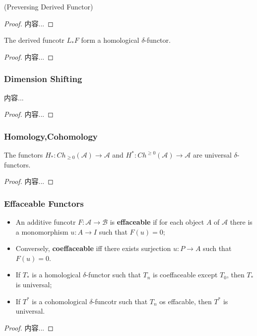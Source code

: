 \documentclass[Total.tex]{subfiles}
\begin{document}
			\begin{proposition}
				(Preversing Derived Functor)
			\end{proposition}
			\begin{proof}
				内容...
			\end{proof}
			
			\begin{theorem}
				The derived funcotr $L_*F$ form a homological $\delta$-functor.
			\end{theorem}
			\begin{proof}
				内容...
			\end{proof}
			\subsubsection{Dimension Shifting}
			\begin{proposition}
				内容...
			\end{proposition}
			\begin{proof}
				内容...
			\end{proof}
			\subsubsection{Homology,Cohomology}
			\begin{proposition}
				The functors $H_*:Ch_{\geq 0}(\mathcal{A})\rightarrow \mathcal{A}$ and $H^*:Ch^{\geq 0}(\mathcal{A})\rightarrow \mathcal{A}$ are universal $\delta$-functors.
			\end{proposition}
			\begin{proof}
				内容...
			\end{proof}
			\subsubsection{Effaceable Functors}
			\begin{Def}
				\begin{itemize}
					\item An additive funcotr $F:\mathcal{A}\rightarrow \mathcal{B}$ is \textbf{effaceable} if for each object $A$ of $\mathcal{A}$ there is a monomorphism $u:A\rightarrow I$ such that $F(u)=0$;
					\item Conversely, \textbf{coeffaceable} iff there exists surjection $u:P\rightarrow A$ such that $F(u)=0$.
				\end{itemize}
			\end{Def}
			\begin{proposition}
				\begin{itemize}
					\item If $T_*$ is a homological $\delta$-functor such that $T_n$ is coeffaceable except $T_0$, then $T_*$ is universal;
					\item If $T^*$ is a cohomological $\delta$-funcotr such that $T_n$ os effacable, then $T^*$ is universal. 
				\end{itemize}
			\end{proposition}
			\begin{proof}
				内容...
			\end{proof}
\end{document}
